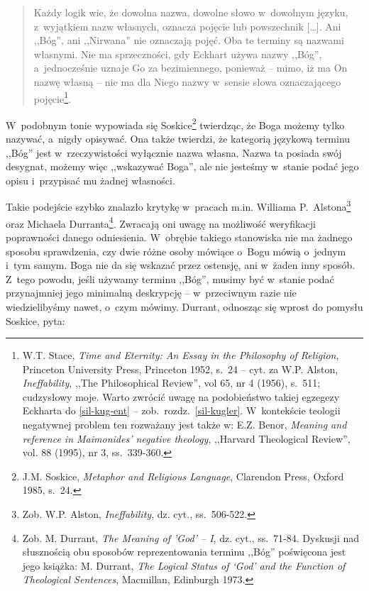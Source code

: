 \begin{quote}
Każdy logik wie, że dowolna nazwa, dowolne słowo w~dowolnym języku, z~wyjątkiem nazw własnych, oznacza pojęcie lub powszechnik [\ldots]. Ani ,,Bóg'', ani ,,Nirwana'' nie oznaczają pojęć. Oba te terminy są nazwami własnymi. Nie ma sprzeczności, gdy Eckhart używa nazwy ,,Bóg'', a~jednocześnie uznaje Go za bezimiennego, ponieważ -- mimo, iż ma On nazwę własną -- nie ma dla Niego nazwy w~sensie słowa oznaczającego pojęcie\footnote{W.T. Stace, \textit{Time and Eternity: An Essay in the Philosophy of Religion}, Princeton University Press, Princeton 1952, s.~24 -- cyt. za W.P. Alston, \textit{Ineffability}, ,,The Philosophical Review'', vol 65, nr 4 (1956), s.~511; cudzysłowy moje. Warto zwrócić uwagę na podobieństwo takiej egzegezy Eckharta do \ref{sil-kug-ent} -- zob.~rozdz.~\ref{sil-kugler}. W~kontekście teologii negatywnej problem ten rozważany jest także w: E.Z. Benor, \textit{Meaning and reference in Maimonides' negative theology}, ,,Harvard Theological Review'', vol. 88 (1995), nr 3, ss.~339-360.}.
\end{quote}

W~podobnym tonie wypowiada się Soskice\footnote{J.M. Soskice, \textit{Metaphor and Religious Language}, Clarendon Press, Oxford 1985, s.~24.} twierdząc, że Boga możemy tylko nazywać, a~nigdy opisywać. Ona także twierdzi, że kategorią językową terminu ,,Bóg'' jest w~rzeczywistości wyłącznie nazwa własna. Nazwa ta posiada swój desygnat, możemy więc ,,wskazywać
Boga'', ale nie jesteśmy w~stanie podać jego opisu i~przypisać mu żadnej własności.

Takie podejście szybko znalazło krytykę w~pracach m.in. Williama P.~Alstona\footnote{Zob. W.P. Alston, \textit{Ineffability}, dz. cyt., ss.~506-522.} oraz Michaela Durranta\footnote{Zob. M. Durrant, \textit{The Meaning of 'God' -- I},
dz. cyt.,
ss.~71-84. Dyskusji nad słusznością obu sposobów reprezentowania terminu ,,Bóg'' poświęcona jest jego książka: M. Durrant, \textit{The Logical Status of ‘God' and the Function of Theological Sentences}, Macmillan, Edinburgh 1973.}. Zwracają oni uwagę na możliwość weryfikacji poprawności danego odniesienia. W~obrębie takiego stanowiska nie ma żadnego sposobu sprawdzenia, czy dwie różne osoby mówiące o~Bogu mówią o~jednym i~tym samym. Boga nie da się wskazać przez ostensję, ani w~żaden inny sposób. Z~tego powodu, jeśli używamy terminu ,,Bóg'', musimy być w~stanie podać przynajmniej jego minimalną deskrypcję -- w~przeciwnym razie nie wiedzielibyśmy nawet, o~czym mówimy. Durrant, odnosząc się wprost do pomysłu Soskice, pyta:

